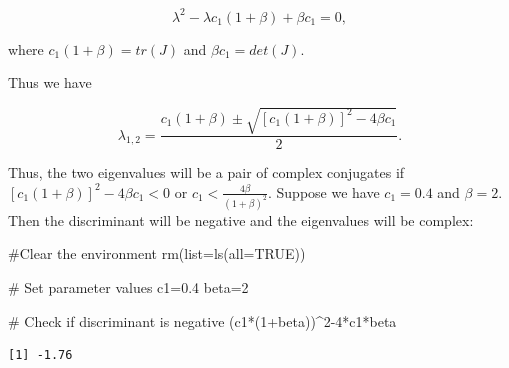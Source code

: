\documentclass[
  letterpaper,
  DIV=11,
  numbers=noendperiod]{scrreprt}
\newenvironment{Shaded}{\begin{snugshade}}{\end{snugshade}}
\newcommand{\AttributeTok}[1]{\textcolor[rgb]{0.40,0.45,0.13}{#1}}
\newcommand{\CommentTok}[1]{\textcolor[rgb]{0.37,0.37,0.37}{#1}}
\newcommand{\ConstantTok}[1]{\textcolor[rgb]{0.56,0.35,0.01}{#1}}
\newcommand{\DecValTok}[1]{\textcolor[rgb]{0.68,0.00,0.00}{#1}}
\newcommand{\DocumentationTok}[1]{\textcolor[rgb]{0.37,0.37,0.37}{\textit{#1}}}
\newcommand{\FloatTok}[1]{\textcolor[rgb]{0.68,0.00,0.00}{#1}}
\newcommand{\FunctionTok}[1]{\textcolor[rgb]{0.28,0.35,0.67}{#1}}
\newcommand{\NormalTok}[1]{\textcolor[rgb]{0.00,0.23,0.31}{#1}}
\newcommand{\OtherTok}[1]{\textcolor[rgb]{0.00,0.23,0.31}{#1}}
\newcommand{\SpecialCharTok}[1]{\textcolor[rgb]{0.37,0.37,0.37}{#1}}
\begin{document}
\[\lambda^2-\lambda c_1(1+\beta)+\beta c_1=0,\]

where \(c_1(1+\beta) =tr(J)\) and \(\beta c_1 = det(J)\).

Thus we have

\[
\lambda_{1,2} = \frac{c_1(1+\beta) \pm \sqrt{[c_1(1+\beta)]^2-4\beta c_1}}{2}.
\]

Thus, the two eigenvalues will be a pair of complex conjugates if
\([c_1(1+\beta)]^2-4\beta c_1 <0\) or
\(c_1 < \frac{4\beta}{(1+\beta)^2}\). Suppose we have \(c_1=0.4\) and
\(\beta=2\). Then the discriminant will be negative and the eigenvalues
will be complex:

\begin{Shaded}
\begin{Highlighting}[]
\CommentTok{\#Clear the environment }
\FunctionTok{rm}\NormalTok{(}\AttributeTok{list=}\FunctionTok{ls}\NormalTok{(}\AttributeTok{all=}\ConstantTok{TRUE}\NormalTok{))}

\CommentTok{\# Set parameter values}
\NormalTok{c1}\OtherTok{=}\FloatTok{0.4}
\NormalTok{beta}\OtherTok{=}\DecValTok{2}

\CommentTok{\# Check if discriminant is negative}
\NormalTok{(c1}\SpecialCharTok{*}\NormalTok{(}\DecValTok{1}\SpecialCharTok{+}\NormalTok{beta))}\SpecialCharTok{\^{}}\DecValTok{2{-}4}\SpecialCharTok{*}\NormalTok{c1}\SpecialCharTok{*}\NormalTok{beta}
\end{Highlighting}
\end{Shaded}

\begin{verbatim}
[1] -1.76
\end{verbatim}

\begin{Shaded}
\end{Shaded}
\end{document}
